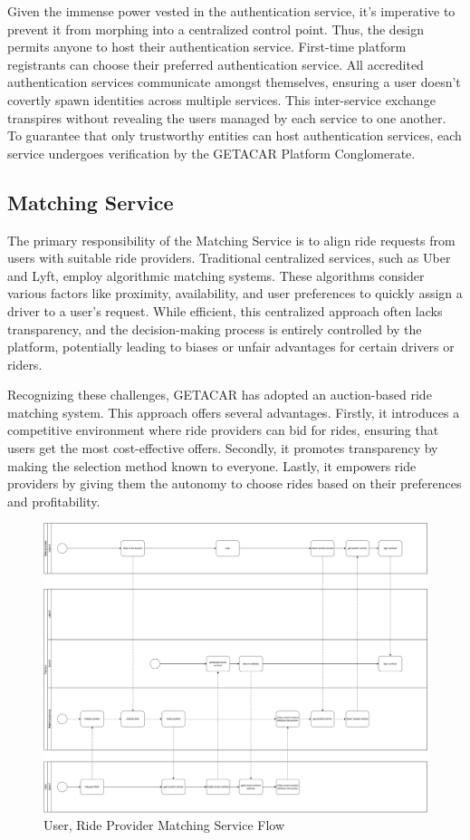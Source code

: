Given the immense power vested in the authentication service, it's imperative to prevent it from morphing into a centralized control point. Thus, the design permits anyone to host their authentication service. First-time platform registrants can choose their preferred authentication service. All accredited authentication services communicate amongst themselves, ensuring a user doesn't covertly spawn identities across multiple services. This inter-service exchange transpires without revealing the users managed by each service to one another. To guarantee that only trustworthy entities can host authentication services, each service undergoes verification by the GETACAR Platform Conglomerate.

\subsection{Matching Service}
The primary responsibility of the Matching Service is to align ride requests from users with suitable ride providers. Traditional centralized services, such as Uber and Lyft, employ algorithmic matching systems. These algorithms consider various factors like proximity, availability, and user preferences to quickly assign a driver to a user's request. While efficient, this centralized approach often lacks transparency, and the decision-making process is entirely controlled by the platform, potentially leading to biases or unfair advantages for certain drivers or riders.

Recognizing these challenges, GETACAR has adopted an auction-based ride matching system. This approach offers several advantages. Firstly, it introduces a competitive environment where ride providers can bid for rides, ensuring that users get the most cost-effective offers. Secondly, it promotes transparency by making the selection method known to everyone. Lastly, it empowers ride providers by giving them the autonomy to choose rides based on their preferences and profitability.

\begin{figure}[h]
    \centering
    \includegraphics[width=\linewidth]{data/5.svg}
    \caption{User, Ride Provider Matching Service Flow}
    \label{fig:directSVG}
\end{figure}


